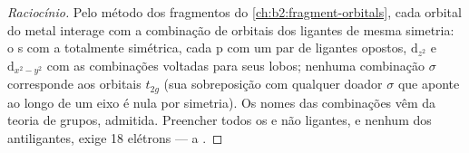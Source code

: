 \begin{proof}[Raciocínio]
Pelo método dos fragmentos do \cref{ch:b2:fragment-orbitals}, cada orbital do
metal interage com a combinação de orbitais dos ligantes de mesma simetria: o
s com a totalmente simétrica, cada p com um par de ligantes opostos, $\mathrm d_{z^2}$ e $\mathrm
d_{x^2-y^2}$ com as combinações voltadas para seus lobos; nenhuma combinação
$\sigma$ corresponde aos orbitais $t_{2g}$ (sua sobreposição com qualquer doador
$\sigma$ que aponte ao longo de um eixo é nula por simetria). Os nomes das
combinações vêm da teoria de grupos, admitida. Preencher todos os  e não ligantes, e nenhum dos antiligantes, exige
18 elétrons --- a .
\end{proof}

